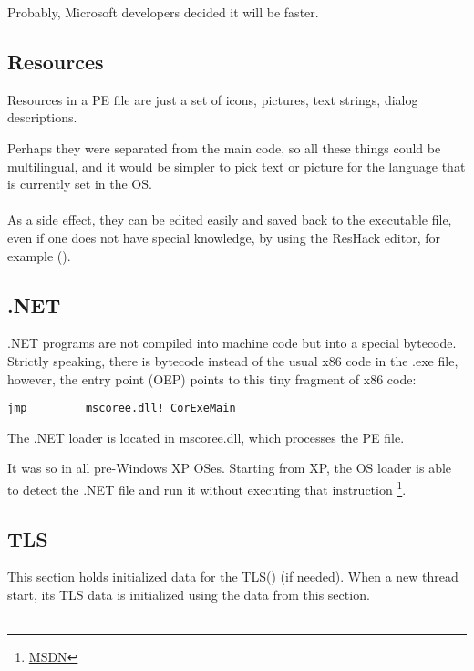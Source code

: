 Probably, Microsoft developers decided it will be faster.

\subsection{Resources}

\label{PEresources}

Resources in a PE file are just a set of icons, pictures, text strings, dialog descriptions.

Perhaps they were separated from the main code, so all these things could be multilingual,
and it would be simpler to pick text or picture for the language that is currently set in the \ac{OS}. \\
\\
As a side effect, they can be edited easily and saved back to the executable file, even if one does not have special knowledge, 
by using the ResHack editor, for example ().

\subsection{.NET}


.NET programs are not compiled into machine code but into a special bytecode.
Strictly speaking, there is bytecode instead of the usual x86 code
in the .exe file, however, the entry point (\ac{OEP}) points to this tiny fragment of x86 code:

\begin{lstlisting}
jmp         mscoree.dll!_CorExeMain
\end{lstlisting}

The .NET loader is located in mscoree.dll, which processes the PE file.

It was so in all pre-Windows XP \ac{OS}es. Starting from XP, the \ac{OS} loader is able to detect the .NET file
and run it without executing that \JMP instruction
\footnote{\href{http://go.yurichev.com/17051}{MSDN}}.

\subsection{TLS}

This section holds initialized data for the \ac{TLS}() (if needed).
When a new thread start, its \ac{TLS} data is initialized using the data from this section. \\
\\

